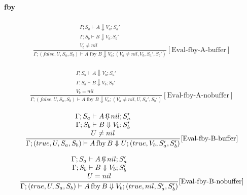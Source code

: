 \documentclass{scrartcl}
\DeclareMathOperator{\fby}{fby}
\DeclareMathOperator{\ceval}{\overset{C}{\smash{\Downarrow}}}
\begin{document}
    \paragraph{fby}
    
    \begin{align*}
    \frac{
        \begin{matrix}
        \Gamma; S_a \vdash A \Downarrow V_a; S_a' \\
        \Gamma; S_b \vdash B \Downarrow V_b; S_b' \\
        V_b \neq nil
        \end{matrix}
    }{
        \Gamma; (false, U, S_a, S_b) \vdash A \fby B \Downarrow V_a; (V_a \neq nil, V_b, S_a', S_b')
    }[\text{Eval-fby-A-buffer}]
    \end{align*}
    
    \begin{align*}
    \frac{
        \begin{matrix}
        \Gamma; S_a \vdash A \Downarrow V_a; S_a' \\
        \Gamma; S_b \vdash B \Downarrow V_b; S_b' \\
        V_b = nil
        \end{matrix}
    }{
        \Gamma; (false, U, S_a, S_b) \vdash A \fby B \Downarrow V_a; (V_a \neq nil, U, S_a', S_b')
    }[\text{Eval-fby-A-nobuffer}]
    \end{align*}
    
    \begin{align*}
    \frac{
        \begin{matrix}
        \Gamma; S_a \vdash A \ceval nil; S_a' \\
        \Gamma; S_b \vdash B \Downarrow V_b; S_b' \\
        U \neq nil
        \end{matrix}
    }{
        \Gamma; (true, U, S_a, S_b) \vdash A \fby B \Downarrow U; (true, V_b, S_a', S_b')
    }[\text{Eval-fby-B-buffer}]
    \end{align*}
    
    \begin{align*}
    \frac{
        \begin{matrix}
        \Gamma; S_a \vdash A \ceval nil; S_a' \\
        \Gamma; S_b \vdash B \Downarrow V_b; S_b' \\
        U = nil
        \end{matrix}
    }{
        \Gamma; (true, U, S_a, S_b) \vdash A \fby B \Downarrow V_b; (true, nil, S_a', S_b')
    }[\text{Eval-fby-B-nobuffer}]
    \end{align*}
    
\end{document}

